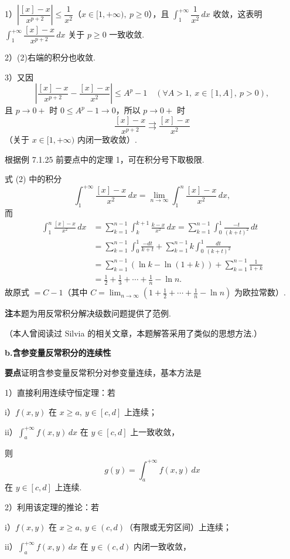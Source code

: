 \documentclass[UTF8, 12pt, fontset=fandol, oneside]{ctexart}
\begin{document}
1）$\left|\dfrac{[x]-x}{x^{p+2}}\right|\le\dfrac1{x^2}$（$x\in[1,+\infty),\ p\ge0$），且 $\displaystyle\int_1^{+\infty}\dfrac1{x^2}\,dx$ 收敛，这表明 $\displaystyle\int_1^{+\infty}\dfrac{[x]-x}{x^{p+2}}\,dx$ 关于 $p\ge0$ 一致收敛.

2）(2)右端的积分也收敛.

3）又因
\[
\left|\frac{[x]-x}{x^{p+2}}-\frac{[x]-x}{x^2}\right|\le A^p-1\quad(\forall A>1,\ x\in[1,A],\ p>0),
\]
且 $p\to0+$ 时 $0\le A^p-1\to0$，所以 $p\to0+$ 时
\[
\frac{[x]-x}{x^{p+2}}\rightrightarrows\frac{[x]-x}{x^2}
\]
（关于 $x\in[1,+\infty)$ 内闭一致收敛）.

根据例 7.1.25 前要点中的定理 1，可在积分号下取极限.

式 (2) 中的积分
\[
\int_1^{+\infty}\frac{[x]-x}{x^2}\,dx
=\lim_{n\to\infty}\int_1^n\frac{[x]-x}{x^2}\,dx,
\]
而
\[
\begin{aligned}
\int_1^n\frac{[x]-x}{x^2}\,dx
&=\sum_{k=1}^{n-1}\int_k^{k+1}\frac{k-x}{x^2}\,dx
=\sum_{k=1}^{n-1}\int_0^1\frac{-t}{(k+t)^2}\,dt\\
&=\sum_{k=1}^{n-1}\int_0^1\frac{-dt}{k+t}
+\sum_{k=1}^{n-1}k\int_0^1\frac{dt}{(k+t)^2}\\
&=\sum_{k=1}^{n-1}(\ln k-\ln(1+k))+\sum_{k=1}^{n-1}\frac1{1+k}\\
&=\frac12+\frac13+\cdots+\frac1n-\ln n.
\end{aligned}
\]
故原式 $=C-1$（其中 $C=\displaystyle\lim_{n\to\infty}\left(1+\frac12+\cdots+\frac1n-\ln n\right)$ 为欧拉常数）.

\noindent\textbf{注}\quad 本题为用反常积分解决级数问题提供了范例.

（本人曾阅读过 Silvia 的相关文章，本题解答采用了类似的思想方法.）

\noindent\textbf{b.\quad 含参变量反常积分的连续性}

\noindent\textbf{要点}\quad 证明含参变量反常积分对参变量连续，基本方法是

1）直接利用连续守恒定理：若

i）$f(x,y)$ 在 $x\ge a,\ y\in[c,d]$ 上连续；

ii）$\displaystyle\int_a^{+\infty}f(x,y)\,dx$ 在 $y\in[c,d]$ 上一致收敛，

则
\[
g(y)=\int_a^{+\infty}f(x,y)\,dx
\]
在 $y\in[c,d]$ 上连续.

2）利用该定理的推论：若

i）$f(x,y)$ 在 $x\ge a,\ y\in(c,d)$（有限或无穷区间）上连续；

ii）$\displaystyle\int_a^{+\infty}f(x,y)\,dx$ 在 $y\in(c,d)$ 内闭一致收敛，
\end{document}
